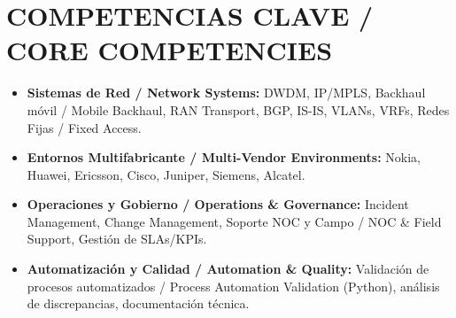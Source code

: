 \section*{COMPETENCIAS CLAVE / CORE COMPETENCIES}

\begin{itemize}
    \item \textbf{Sistemas de Red / Network Systems:} DWDM, IP/MPLS, Backhaul móvil / Mobile Backhaul, RAN Transport, BGP, IS-IS, VLANs, VRFs, Redes Fijas / Fixed Access.
    \item \textbf{Entornos Multifabricante / Multi-Vendor Environments:} Nokia, Huawei, Ericsson, Cisco, Juniper, Siemens, Alcatel.
    \item \textbf{Operaciones y Gobierno / Operations \& Governance:} Incident Management, Change Management, Soporte NOC y Campo / NOC \& Field Support, Gestión de SLAs/KPIs.
    \item \textbf{Automatización y Calidad / Automation \& Quality:} Validación de procesos automatizados / Process Automation Validation (Python), análisis de discrepancias, documentación técnica.
\end{itemize}